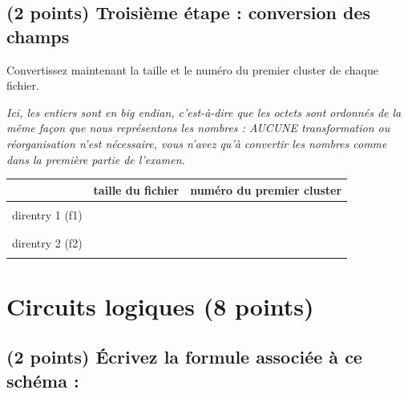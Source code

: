 \documentclass[11pt,a4paper]{article}
\begin{document}
\vspace*{-0.25cm}


\subsection{(2 points) Troisième étape : conversion des champs }

\noindent Convertissez maintenant la taille et le numéro du premier cluster de chaque fichier.

\smallskip

\noindent \textit{Ici, les entiers sont en big endian, c'est-à-dire que les octets sont ordonnés de la même façon que nous représentons les nombres : AUCUNE transformation ou réorganisation n'est nécessaire, vous n'avez qu'à convertir les nombres comme dans la première partie de l'examen.}

\smallskip

\begin{center}
\begin{tabular}{ | c | C{5cm} | C{7.5cm} | }
\hline
 & taille du fichier & numéro du premier cluster \\
\hline
 & & \\
direntry 1 (f1) & & \\
 & & \\
\hline
 & & \\
direntry 2 (f2) & & \\
 & & \\
\hline
\end{tabular}
\end{center}


\clearpage



\section{Circuits logiques (8 points)}

\subsection{(2 points) \'Ecrivez la formule associée à ce schéma : }

\smallskip

\begin{figure}[ht!]
\end{figure}
\end{document}
